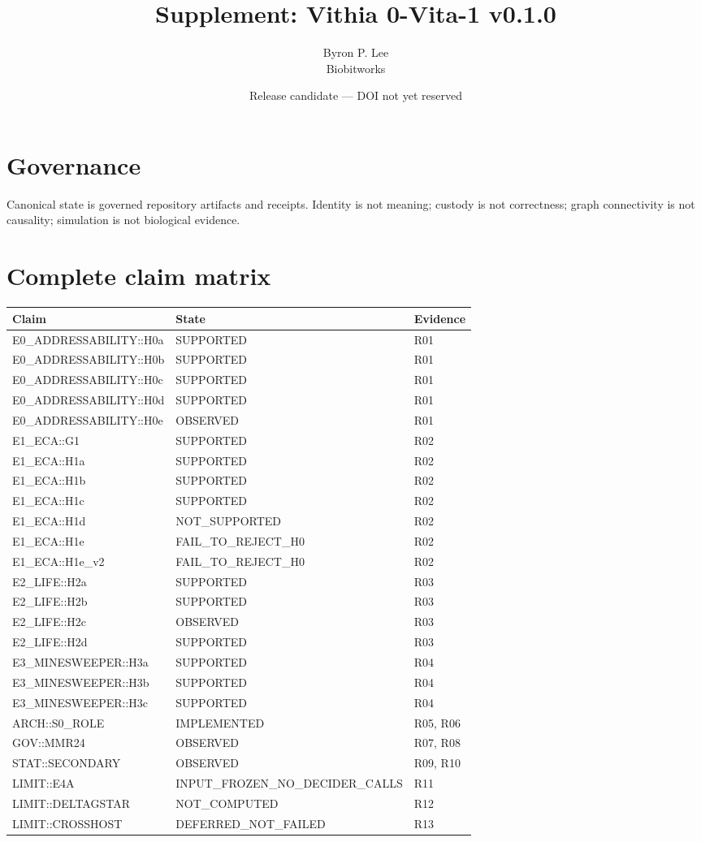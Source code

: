 \documentclass[10pt]{article}
\title{Supplement: Vithia 0-Vita-1 v0.1.0}
\author{Byron P. Lee\\Biobitworks}
\date{Release candidate --- DOI not yet reserved}
\begin{document}
\maketitle
\section{Governance}Canonical state is governed repository artifacts and receipts. Identity is not meaning; custody is not correctness; graph connectivity is not causality; simulation is not biological evidence.
\section{Complete claim matrix}
\scriptsize\sloppy\begin{longtable}{>{\raggedright\arraybackslash}p{}>{\raggedright\arraybackslash}p{}>{\raggedright\arraybackslash}p{}}\toprule Claim & State & Evidence\\\midrule\endhead
E0\_ADDRESSABILITY::H0a & SUPPORTED & R01\\
E0\_ADDRESSABILITY::H0b & SUPPORTED & R01\\
E0\_ADDRESSABILITY::H0c & SUPPORTED & R01\\
E0\_ADDRESSABILITY::H0d & SUPPORTED & R01\\
E0\_ADDRESSABILITY::H0e & OBSERVED & R01\\
E1\_ECA::G1 & SUPPORTED & R02\\
E1\_ECA::H1a & SUPPORTED & R02\\
E1\_ECA::H1b & SUPPORTED & R02\\
E1\_ECA::H1c & SUPPORTED & R02\\
E1\_ECA::H1d & NOT\_SUPPORTED & R02\\
E1\_ECA::H1e & FAIL\_TO\_REJECT\_H0 & R02\\
E1\_ECA::H1e\_v2 & FAIL\_TO\_REJECT\_H0 & R02\\
E2\_LIFE::H2a & SUPPORTED & R03\\
E2\_LIFE::H2b & SUPPORTED & R03\\
E2\_LIFE::H2c & OBSERVED & R03\\
E2\_LIFE::H2d & SUPPORTED & R03\\
E3\_MINESWEEPER::H3a & SUPPORTED & R04\\
E3\_MINESWEEPER::H3b & SUPPORTED & R04\\
E3\_MINESWEEPER::H3c & SUPPORTED & R04\\
ARCH::S0\_ROLE & IMPLEMENTED & R05, R06\\
GOV::MMR24 & OBSERVED & R07, R08\\
STAT::SECONDARY & OBSERVED & R09, R10\\
LIMIT::E4A & INPUT\_FROZEN\_NO\_DECIDER\_CALLS & R11\\
LIMIT::DELTAGSTAR & NOT\_COMPUTED & R12\\
LIMIT::CROSSHOST & DEFERRED\_NOT\_FAILED & R13\\
\bottomrule\end{longtable}\normalsize
\end{document}
